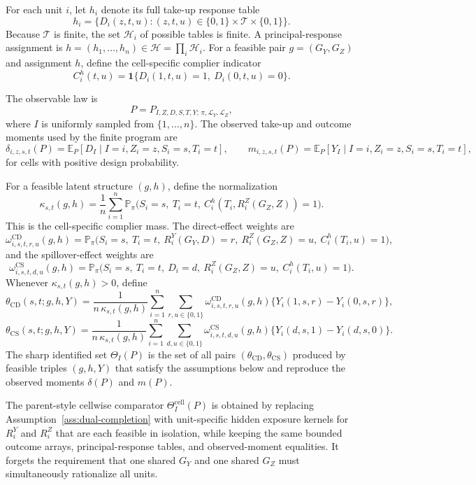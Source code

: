 \documentclass[11pt]{article}
\newcommand{\E}{\mathbb{E}}
\renewcommand{\Pr}{\mathbb{P}}
\newcommand{\one}{\mathbf{1}}
\newcommand{\calH}{\mathcal{H}}
\theoremstyle{definition}
\theoremstyle{plain}
\theoremstyle{remark}
\begin{document}
For each unit \(i\), let \(h_i\) denote its full take-up response table
\[
h_i=\{D_i(z,t,u):(z,t,u)\in\{0,1\}\times\mathcal T\times\{0,1\}\}.
\]
Because \(\mathcal T\) is finite, the set \(\calH_i\) of possible tables is finite. A principal-response assignment is \(h=(h_1,\ldots,h_n)\in\calH=\prod_i\calH_i\). For a feasible pair \(g=(G_Y,G_Z)\) and assignment \(h\), define the cell-specific complier indicator
\[
C_i^{h}(t,u)=\one\{D_i(1,t,u)=1,\ D_i(0,t,u)=0\}.
\]

The observable law is
\[
P=P_{I,Z,D,S,T,Y;\,\pi,\mathcal L_Y,\mathcal L_Z},
\]
where \(I\) is uniformly sampled from \(\{1,\ldots,n\}\). The observed take-up and outcome moments used by the finite program are
\[
\delta_{i,z,s,t}(P)=\E_P[D_I\mid I=i,Z_i=z,S_i=s,T_i=t],
\qquad
m_{i,z,s,t}(P)=\E_P[Y_I\mid I=i,Z_i=z,S_i=s,T_i=t],
\]
for cells with positive design probability.

For a feasible latent structure \((g,h)\), define the normalization
\[
\kappa_{s,t}(g,h)
=\frac1n\sum_{i=1}^n
\Pr_\pi\!\big(S_i=s,\ T_i=t,\ C_i^{h}(T_i,R_i^Z(G_Z,Z))=1\big).
\]
This is the cell-specific complier mass. The direct-effect weights are
\[
\omega^{\mathrm{CD}}_{i,s,t,r,u}(g,h)
=\Pr_\pi\!\big(S_i=s,\ T_i=t,\ R_i^Y(G_Y,D)=r,\ R_i^Z(G_Z,Z)=u,\ C_i^{h}(T_i,u)=1\big),
\]
and the spillover-effect weights are
\[
\omega^{\mathrm{CS}}_{i,s,t,d,u}(g,h)
=\Pr_\pi\!\big(S_i=s,\ T_i=t,\ D_i=d,\ R_i^Z(G_Z,Z)=u,\ C_i^{h}(T_i,u)=1\big).
\]
Whenever \(\kappa_{s,t}(g,h)>0\), define
\[
\theta_{\mathrm{CD}}(s,t;g,h,Y)
=
\frac{1}{n\,\kappa_{s,t}(g,h)}
\sum_{i=1}^n\sum_{r,u\in\{0,1\}}
\omega^{\mathrm{CD}}_{i,s,t,r,u}(g,h)\{Y_i(1,s,r)-Y_i(0,s,r)\},
\]
\[
\theta_{\mathrm{CS}}(s,t;g,h,Y)
=
\frac{1}{n\,\kappa_{s,t}(g,h)}
\sum_{i=1}^n\sum_{d,u\in\{0,1\}}
\omega^{\mathrm{CS}}_{i,s,t,d,u}(g,h)\{Y_i(d,s,1)-Y_i(d,s,0)\}.
\]
The sharp identified set \(\Theta_I(P)\) is the set of all pairs \((\theta_{\mathrm{CD}},\theta_{\mathrm{CS}})\) produced by feasible triples \((g,h,Y)\) that satisfy the assumptions below and reproduce the observed moments \(\delta(P)\) and \(m(P)\).

The parent-style cellwise comparator \(\Theta_I^{\mathrm{cell}}(P)\) is obtained by replacing Assumption~\ref{ass:dual-completion} with unit-specific hidden exposure kernels for \(R_i^Y\) and \(R_i^Z\) that are each feasible in isolation, while keeping the same bounded outcome arrays, principal-response tables, and observed-moment equalities. It forgets the requirement that one shared \(G_Y\) and one shared \(G_Z\) must simultaneously rationalize all units.
\end{document}
